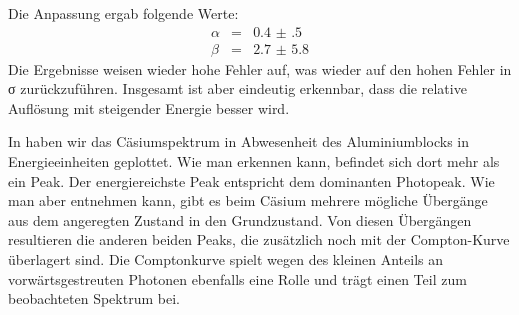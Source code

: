 Die Anpassung ergab folgende Werte:
\begin{eqnarray}
 \alpha &=& \num{0.4(5)}  \\
 \beta &=& \num{2.7(58)}
\end{eqnarray}
Die Ergebnisse weisen wieder hohe Fehler auf, was wieder auf den hohen Fehler
in σ zurückzuführen. Insgesamt ist aber eindeutig erkennbar, dass die relative
Auflösung mit steigender Energie besser wird.

In  haben wir das Cäsiumspektrum in
Abwesenheit des Aluminiumblocks in Energieeinheiten geplottet. Wie man
erkennen kann, befindet sich dort mehr als ein Peak. Der energiereichste
Peak entspricht dem dominanten Photopeak. Wie man \cite[Abb.4]{script} aber
entnehmen kann, gibt es beim Cäsium mehrere mögliche Übergänge aus dem
angeregten Zustand in den Grundzustand. Von diesen Übergängen resultieren die anderen
beiden Peaks, die zusätzlich noch mit der Compton-Kurve überlagert sind. Die
Comptonkurve spielt wegen des kleinen Anteils an vorwärtsgestreuten Photonen
ebenfalls eine Rolle und trägt einen Teil zum beobachteten Spektrum bei.

